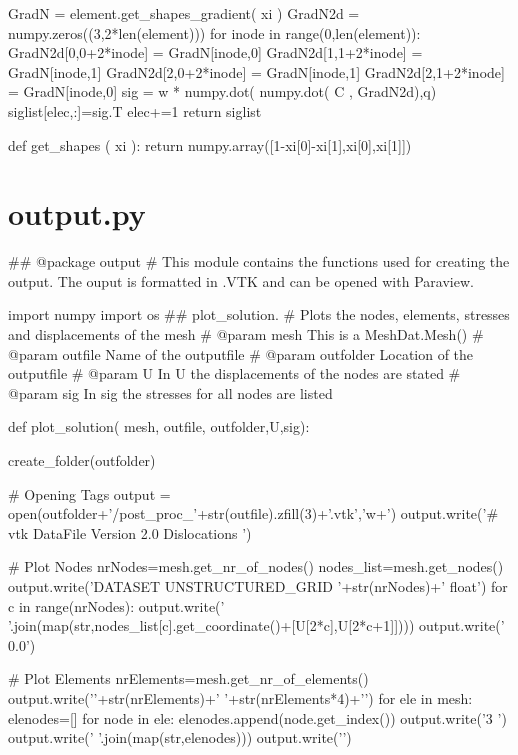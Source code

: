 \begin{appendices}
\begin{spverbatim}
        GradN = element.get_shapes_gradient( xi )
        GradN2d = numpy.zeros((3,2*len(element)))
        for inode in range(0,len(element)):
            GradN2d[0,0+2*inode] = GradN[inode,0]
            GradN2d[1,1+2*inode] = GradN[inode,1]
            GradN2d[2,0+2*inode] = GradN[inode,1]
            GradN2d[2,1+2*inode] = GradN[inode,0]
        sig = w * numpy.dot( numpy.dot( C , GradN2d),q)
        siglist[elec,:]=sig.T
        elec+=1
    return siglist

def get_shapes ( xi ):
    return numpy.array([1-xi[0]-xi[1],xi[0],xi[1]])


\end{spverbatim}

\section{output.py}
\begin{spverbatim}
## @package output
#  This module contains the functions used for creating the output. The ouput is formatted in .VTK and can be opened with Paraview.

import numpy
import os
## plot_solution.
#  Plots the nodes, elements, stresses and displacements of the mesh
#  @param mesh This is a MeshDat.Mesh()
#  @param outfile Name of the outputfile
#  @param outfolder Location of the outputfile
#  @param U In U the displacements of the nodes are stated
#  @param sig In sig the stresses for all nodes are listed

def plot_solution( mesh, outfile, outfolder,U,sig):

    create_folder(outfolder)

    # Opening Tags
    output = open(outfolder+'/post_proc_'+str(outfile).zfill(3)+'.vtk','w+')
    output.write('# vtk DataFile Version 2.0 \nDiscrete Dislocations \nASCII \n\n')

    # Plot Nodes
    nrNodes=mesh.get_nr_of_nodes()
    nodes_list=mesh.get_nodes()
    output.write('DATASET UNSTRUCTURED_GRID \nPOINTS '+str(nrNodes)+' float\n')
    for c in range(nrNodes):
        output.write(' '.join(map(str,nodes_list[c].get_coordinate()+[U[2*c],U[2*c+1]])))
        output.write(' 0.0\n')



    # Plot Elements
    nrElements=mesh.get_nr_of_elements()
    output.write('\nCELLS '+str(nrElements)+' '+str(nrElements*4)+'\n')
    for ele in mesh:
        elenodes=[]
        for node in ele:
            elenodes.append(node.get_index())
        output.write('3 ')
        output.write(' '.join(map(str,elenodes)))
        output.write('\n')


\end{spverbatim}
\end{appendices}
